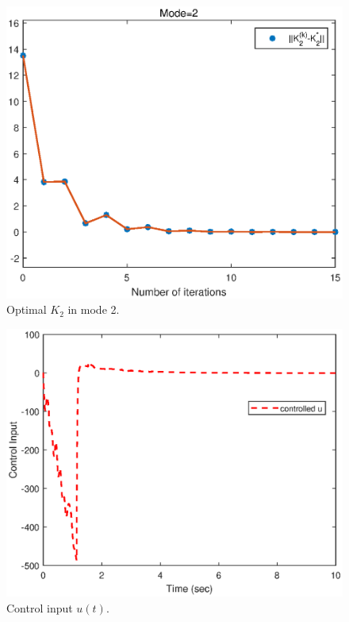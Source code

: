 \documentclass[journal]{IEEEtran}
\begin{document}
\begin{figure} %
	\centering
	\includegraphics[scale=0.6]{optk2mode2.eps}
	\caption{Optimal $K_{2}$ in mode 2.}
	\label{fig:8}
\end{figure}

\begin{figure} %
	\centering
	\includegraphics[scale=0.6]{2u.eps}
	\caption{Control input $u(t)$.}
	\label{fig:9}
\end{figure}
\end{document}
